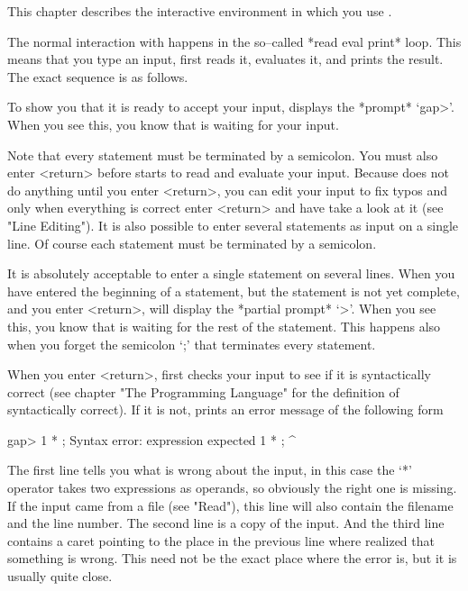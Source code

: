 
This chapter describes the interactive environment in which you use
{\GAP}.


The normal interaction with {\GAP} happens in the so--called *read eval
print* loop. This means that you type an input, {\GAP} first reads it,
evaluates it, and prints the result. The exact sequence is as follows.

To show you that it is ready to accept your input, {\GAP} displays the
*prompt* `gap>'. When you see this, you know that {\GAP} is waiting for
your input.

Note that every statement must be terminated by a semicolon. You must
also enter <return> before {\GAP} starts to read and evaluate your input.
Because {\GAP} does not do anything until you enter <return>, you can
edit your input to fix typos and only when everything is correct enter
<return> and have {\GAP} take a look at it (see "Line Editing"). It is
also possible to enter several statements as input on a single line. Of
course each statement must be terminated by a semicolon.

It is absolutely acceptable to enter a single statement on several lines.
When you have entered the beginning of a statement, but the statement is
not yet complete, and you enter <return>, {\GAP} will display the
*partial prompt* `>'. When you see this, you know that {\GAP} is
waiting for the rest of the statement. This happens also when you forget
the semicolon `;' that terminates every {\GAP} statement.

When you enter <return>, {\GAP} first checks your input to see if it is
syntactically correct (see chapter "The Programming Language" for the
definition of syntactically correct). If it is not, {\GAP} prints an
error message of the following form

\begintt
gap> 1 * ;
Syntax error: expression expected
1 * ;
    ^ 
\endtt

The first line tells you what is wrong about the input, in this case the
`*' operator takes two expressions as operands, so obviously the right
one is missing. If the input came from a file (see "Read"), this line
will also contain the filename and the line number. The second line is a
copy of the input. And the third line contains a caret pointing to the
place in the previous line where {\GAP} realized that something is wrong.
This need not be the exact place where the error is, but it is usually
quite close.

